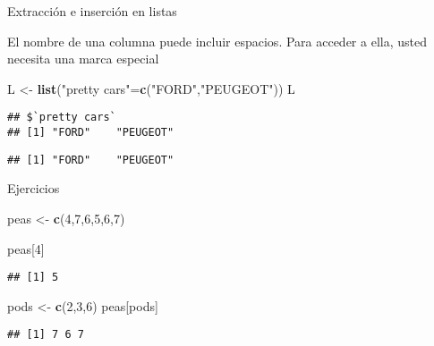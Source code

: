\documentclass[ignorenonframetext,]{beamer}
\newenvironment{Shaded}{\begin{snugshade}}{\end{snugshade}}
\newcommand{\KeywordTok}[1]{\textcolor[rgb]{0.13,0.29,0.53}{\textbf{#1}}}
\newcommand{\DecValTok}[1]{\textcolor[rgb]{0.00,0.00,0.81}{#1}}
\newcommand{\StringTok}[1]{\textcolor[rgb]{0.31,0.60,0.02}{#1}}
\newcommand{\OperatorTok}[1]{\textcolor[rgb]{0.81,0.36,0.00}{\textbf{#1}}}
\newcommand{\NormalTok}[1]{#1}
\begin{document}
\begin{frame}[fragile]{Extracción e inserción en listas}

El nombre de una columna puede incluir espacios. Para acceder a ella,
usted necesita una marca especial

\begin{Shaded}
\begin{Highlighting}[]
\NormalTok{L <-}\StringTok{ }\KeywordTok{list}\NormalTok{(}\StringTok{"pretty cars"}\NormalTok{=}\KeywordTok{c}\NormalTok{(}\StringTok{"FORD"}\NormalTok{,}\StringTok{"PEUGEOT"}\NormalTok{))}
\NormalTok{L}
\end{Highlighting}
\end{Shaded}
\pause
\begin{verbatim}
## $`pretty cars`
## [1] "FORD"    "PEUGEOT"
\end{verbatim}

\begin{Shaded}
\end{Shaded}
\pause
\begin{verbatim}
## [1] "FORD"    "PEUGEOT"
\end{verbatim}

\end{frame}

\begin{frame}[fragile]{Ejercicios}

\begin{Shaded}
\begin{Highlighting}[]
\NormalTok{peas <-}\StringTok{ }\KeywordTok{c}\NormalTok{(}\DecValTok{4}\NormalTok{,}\DecValTok{7}\NormalTok{,}\DecValTok{6}\NormalTok{,}\DecValTok{5}\NormalTok{,}\DecValTok{6}\NormalTok{,}\DecValTok{7}\NormalTok{)}
\end{Highlighting}
\end{Shaded}

\begin{Shaded}
\begin{Highlighting}[]
\NormalTok{peas[}\DecValTok{4}\NormalTok{]}
\end{Highlighting}
\end{Shaded}
\pause
\begin{verbatim}
## [1] 5
\end{verbatim}

\begin{Shaded}
\begin{Highlighting}[]
\NormalTok{pods <-}\StringTok{ }\KeywordTok{c}\NormalTok{(}\DecValTok{2}\NormalTok{,}\DecValTok{3}\NormalTok{,}\DecValTok{6}\NormalTok{)}
\NormalTok{peas[pods]}
\end{Highlighting}
\end{Shaded}
\pause
\begin{verbatim}
## [1] 7 6 7
\end{verbatim}

\end{frame}
\end{document}
